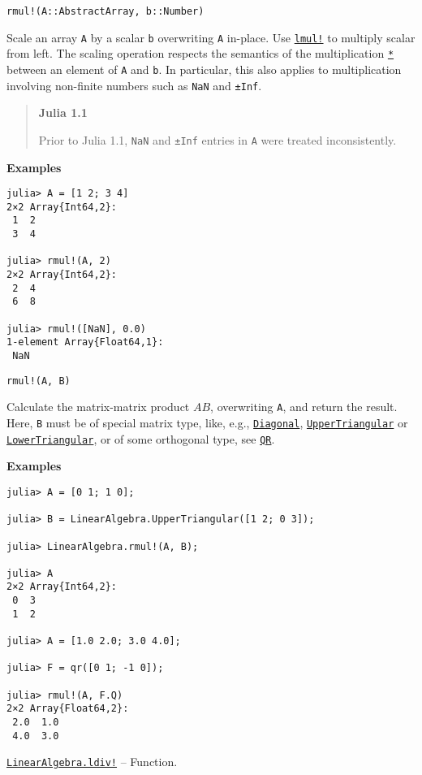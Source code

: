 \begin{adjustwidth}{2em}{0pt}


\begin{verbatim}
rmul!(A::AbstractArray, b::Number)
\end{verbatim}

Scale an array \texttt{A} by a scalar \texttt{b} overwriting \texttt{A} in-place.  Use \hyperlink{12404459690324241452}{\texttt{lmul!}} to multiply scalar from left.  The scaling operation respects the semantics of the multiplication \hyperlink{7592762607639177347}{\texttt{*}} between an element of \texttt{A} and \texttt{b}.  In particular, this also applies to multiplication involving non-finite numbers such as \texttt{NaN} and \texttt{±Inf}.

\begin{quote}
\textbf{Julia 1.1}

Prior to Julia 1.1, \texttt{NaN} and \texttt{±Inf} entries in \texttt{A} were treated inconsistently.

\end{quote}
\textbf{Examples}


\begin{verbatim}
julia> A = [1 2; 3 4]
2×2 Array{Int64,2}:
 1  2
 3  4

julia> rmul!(A, 2)
2×2 Array{Int64,2}:
 2  4
 6  8

julia> rmul!([NaN], 0.0)
1-element Array{Float64,1}:
 NaN
\end{verbatim}




\begin{lstlisting}
rmul!(A, B)
\end{lstlisting}

Calculate the matrix-matrix product \(AB\), overwriting \texttt{A}, and return the result. Here, \texttt{B} must be of special matrix type, like, e.g., \hyperlink{3300114559258360989}{\texttt{Diagonal}}, \hyperlink{6344726545165008167}{\texttt{UpperTriangular}} or \hyperlink{15116078732779234709}{\texttt{LowerTriangular}}, or of some orthogonal type, see \hyperlink{16913872014958777367}{\texttt{QR}}.

\textbf{Examples}


\begin{verbatim}
julia> A = [0 1; 1 0];

julia> B = LinearAlgebra.UpperTriangular([1 2; 0 3]);

julia> LinearAlgebra.rmul!(A, B);

julia> A
2×2 Array{Int64,2}:
 0  3
 1  2

julia> A = [1.0 2.0; 3.0 4.0];

julia> F = qr([0 1; -1 0]);

julia> rmul!(A, F.Q)
2×2 Array{Float64,2}:
 2.0  1.0
 4.0  3.0
\end{verbatim}



\end{adjustwidth}
\hypertarget{11817740014578453690}{} 
\hyperlink{11817740014578453690}{\texttt{LinearAlgebra.ldiv!}}  -- {Function.}

